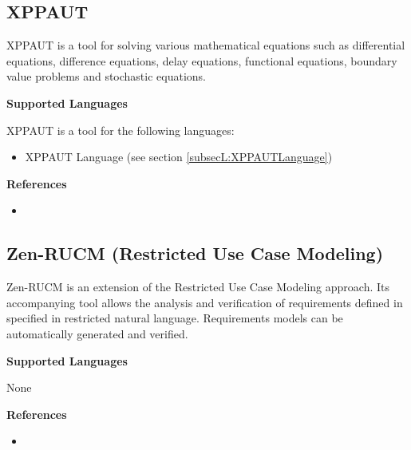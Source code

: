 \subsection{XPPAUT}
\label{subsecT:XPPAUT}


XPPAUT is a tool for solving various mathematical equations such as differential equations, difference equations, delay equations, functional equations, boundary value problems and stochastic equations.

\textbf{Supported Languages}

XPPAUT is a tool for the following languages:
\begin{itemize}
	\item XPPAUT Language (see section \ref{subsecL:XPPAUTLanguage})
\end{itemize}


\textbf{References}
\begin{itemize}
	
\item {}
\end{itemize}



\subsection{Zen-RUCM (Restricted Use Case Modeling)}
\label{subsecT:Zen-RUCM}


Zen-RUCM is an extension of the Restricted Use Case Modeling approach. Its accompanying tool allows the analysis and verification of requirements defined in specified in restricted natural language. Requirements models can be automatically generated and verified.

\textbf{Supported Languages}

None


\textbf{References}
\begin{itemize}
	
\item {}
\end{itemize}
